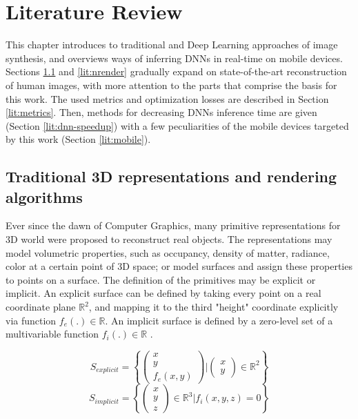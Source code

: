 \chapter{Literature Review}\label{chapter:lit}

This chapter introduces to traditional and Deep Learning approaches of image synthesis, and overviews ways of inferring DNNs in real-time on mobile devices. Sections \ref{lit:traditional-cg} and \ref{lit:nrender} gradually expand on state-of-the-art reconstruction of human images, with more attention to the parts that comprise the basis for this work. The used metrics and optimization losses are described in Section \ref{lit:metrics}. Then, methods for decreasing DNNs inference time are given (Section \ref{lit:dnn-speedup}) with a few peculiarities of the mobile devices targeted by this work (Section \ref{lit:mobile}).

\section{Traditional 3D representations and rendering algorithms}
\label{lit:traditional-cg}

Ever since the dawn of Computer Graphics, many primitive representations for 3D world were proposed to reconstruct real objects. The representations may model volumetric properties, such as occupancy, density of matter, radiance, color at a certain point of 3D space; or model surfaces and assign these properties to points on a surface. The definition of the primitives may be explicit or implicit. An explicit surface can be defined by taking every point on a real coordinate plane $\mathbb{R}^2$, and mapping it to the third "height" coordinate explicitly via function $f_e(.) \in \mathbb{R}$. An implicit surface is defined by a zero-level set of a multivariable function $f_i(.) \in \mathbb{R}$ \cite{survey:advances-nn22}.
\begin{multicols}{2}
\setlength\abovedisplayskip{0pt}
\noindent
\begin{equation}
	\renewcommand\arraystretch{0.6}
	S_{explicit} = \left\{ 
	\left( \begin{array}{c} x \\ y \\ f_{e}(x,y) \end{array} \right) \Bigg\rvert 
	\left( \begin{array}{c} x \\ y \end{array} \right) \in \mathbb{R}^2
	\right\}
\end{equation}
\begin{equation}
	\renewcommand\arraystretch{0.6}
	S_{implicit} = \left\{ \begin{pmatrix} x \\ y \\ z \end{pmatrix} \in \mathbb{R}^3 \Bigg\rvert f_{i}(x, y, z) = 0 \right\}
\end{equation}
\setlength\belowdisplayskip{0pt} 
\end{multicols} 

